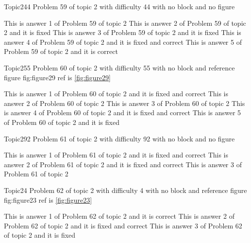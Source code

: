 \documentclass[master]{exam}
\begin{document}
\begin{problem}{Topic2}{44}
	Problem 59 of topic 2 with difficulty 44 with no block and no figure
	\begin{answers}
		\answer This is answer 1 of Problem 59 of topic 2 
		\answer[fixed] This is answer 2 of Problem 59 of topic 2 and it is fixed
		\answer[fixed] This is answer 3 of Problem 59 of topic 2 and it is fixed
		 This is answer 4 of Problem 59 of topic 2 and it is fixed and correct
		\answer[correct] This is answer 5 of Problem 59 of topic 2 and it is correct
	\end{answers}
\end{problem}

\begin{problem}{Topic2}{55}
	Problem 60 of topic 2 with difficulty 55 with no block and reference figure fig:figure29 ref is \ref{fig:figure29}
	\begin{answers}
		 This is answer 1 of Problem 60 of topic 2 and it is fixed and correct
		\answer This is answer 2 of Problem 60 of topic 2 
		\answer This is answer 3 of Problem 60 of topic 2 
		 This is answer 4 of Problem 60 of topic 2 and it is fixed and correct
		\answer[fixed] This is answer 5 of Problem 60 of topic 2 and it is fixed
	\end{answers}
\end{problem}

\begin{problem}{Topic2}{92}
	Problem 61 of topic 2 with difficulty 92 with no block and no figure
	\begin{answers}
		 This is answer 1 of Problem 61 of topic 2 and it is fixed and correct
		 This is answer 2 of Problem 61 of topic 2 and it is fixed and correct
		\answer This is answer 3 of Problem 61 of topic 2 
	\end{answers}
\end{problem}

\begin{problem}{Topic2}{4}
	Problem 62 of topic 2 with difficulty 4 with no block and reference figure fig:figure23 ref is \ref{fig:figure23}
	\begin{answers}
		\answer[correct] This is answer 1 of Problem 62 of topic 2 and it is correct
		 This is answer 2 of Problem 62 of topic 2 and it is fixed and correct
		\answer[fixed] This is answer 3 of Problem 62 of topic 2 and it is fixed
	\end{answers}
\end{problem}
\end{document}
